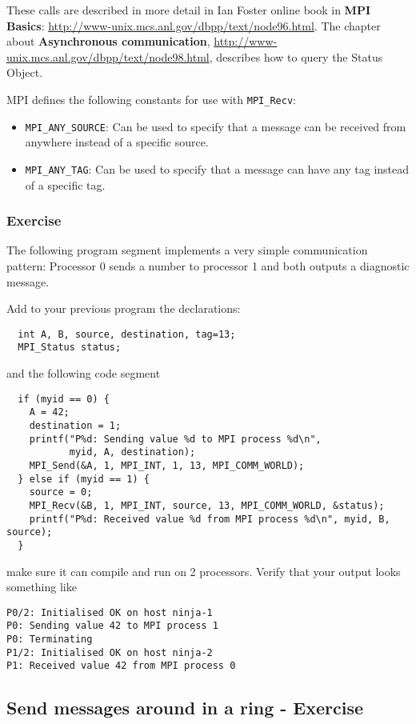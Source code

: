 \documentclass[12pt]{article}
\begin{document}
\noindent These calls are described in more detail in Ian Foster online book
in \textbf{MPI Basics}:
\url{http://www-unix.mcs.anl.gov/dbpp/text/node96.html}.
The chapter about \textbf{Asynchronous communication},
\url{http://www-unix.mcs.anl.gov/dbpp/text/node98.html}, describes how
to query the Status Object.

MPI defines the following constants for use with \texttt{MPI\_Recv}:
\begin{itemize}
  \item \texttt{MPI\_ANY\_SOURCE}: Can be used to specify that a message
  can be received from anywhere instead of a specific source.
  \item \texttt{MPI\_ANY\_TAG}: Can be used to specify that a message
  can have any tag instead of a specific tag.
\end{itemize}

\subsubsection*{Exercise}
The following program segment implements a very simple
communication pattern: Processor 0 sends a number to processor 1 and
both outputs a diagnostic message.

Add to your previous program the declarations:
\begin{verbatim}
  int A, B, source, destination, tag=13;
  MPI_Status status;
\end{verbatim}
and the following code segment
\begin{verbatim}
  if (myid == 0) {
    A = 42;
    destination = 1;
    printf("P%d: Sending value %d to MPI process %d\n",
           myid, A, destination);
    MPI_Send(&A, 1, MPI_INT, 1, 13, MPI_COMM_WORLD);
  } else if (myid == 1) {
    source = 0;
    MPI_Recv(&B, 1, MPI_INT, source, 13, MPI_COMM_WORLD, &status);
    printf("P%d: Received value %d from MPI process %d\n", myid, B, source);
  }
\end{verbatim}
make sure it can compile and run on 2 processors.
Verify that your output looks something like
\begin{verbatim}
P0/2: Initialised OK on host ninja-1
P0: Sending value 42 to MPI process 1
P0: Terminating
P1/2: Initialised OK on host ninja-2
P1: Received value 42 from MPI process 0
\end{verbatim}



\subsection*{Send messages around in a ring - Exercise}
\end{document}
